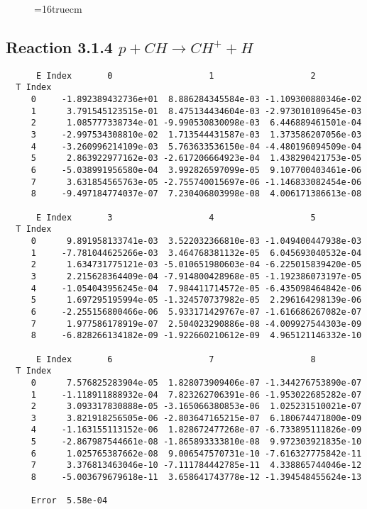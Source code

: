 \documentclass[12pt]{article}
\begin{document}
\begin{figure} \label{met.3_3.1.3}
\epsfxsize=16truecm
\end{figure}
\newpage
 
 
\subsection{ 
Reaction 3.1.4    $p + CH \rightarrow CH^+ + H$
}
 

\begin{small}\begin{verbatim} 
      E Index       0                   1                   2
  T Index
     0     -1.892389432736e+01  8.886284345584e-03 -1.109300880346e-02
     1      3.791545123515e-01  8.475134434604e-03 -2.973010109645e-03
     2      1.085777338734e-01 -9.990530830098e-03  6.446889461501e-04
     3     -2.997534308810e-02  1.713544431587e-03  1.373586207056e-03
     4     -3.260996214109e-03  5.763633536150e-04 -4.480196094509e-04
     5      2.863922977162e-03 -2.617206664923e-04  1.438290421753e-05
     6     -5.038991956580e-04  3.992826597099e-05  9.107700403461e-06
     7      3.631854565763e-05 -2.755740015697e-06 -1.146833082454e-06
     8     -9.497184774037e-07  7.230406803998e-08  4.006171386613e-08
 
      E Index       3                   4                   5
  T Index
     0      9.891958133741e-03  3.522032366810e-03 -1.049400447938e-03
     1     -7.781044625266e-03  3.464768381132e-05  6.045693040532e-04
     2      1.634731775121e-03 -5.010651980603e-04 -6.225015839420e-05
     3      2.215628364409e-04 -7.914800428968e-05 -1.192386073197e-05
     4     -1.054043956245e-04  7.984411714572e-05 -6.435098464842e-06
     5      1.697295195994e-05 -1.324570737982e-05  2.296164298139e-06
     6     -2.255156800466e-06  5.933171429767e-07 -1.616686267082e-07
     7      1.977586178919e-07  2.504023290886e-08 -4.009927544303e-09
     8     -6.828266134182e-09 -1.922660210612e-09  4.965121146332e-10
 
      E Index       6                   7                   8
  T Index
     0      7.576825283904e-05  1.828073909406e-07 -1.344276753890e-07
     1     -1.118911888932e-04  7.823262706391e-06 -1.953022685282e-07
     2      3.093317830888e-05 -3.165066380853e-06  1.025231510021e-07
     3      3.821918256505e-06 -2.803647165215e-07  6.180674471800e-09
     4     -1.163155113152e-06  1.828672477268e-07 -6.733895111826e-09
     5     -2.867987544661e-08 -1.865893333810e-08  9.972303921835e-10
     6      1.025765387662e-08  9.006547570731e-10 -7.616327775842e-11
     7      3.376813463046e-10 -7.111784442785e-11  4.338865744046e-12
     8     -5.003679679618e-11  3.658641743778e-12 -1.394548455624e-13
 
     Error  5.58e-04
\end{verbatim}\end{small}
\end{document}
